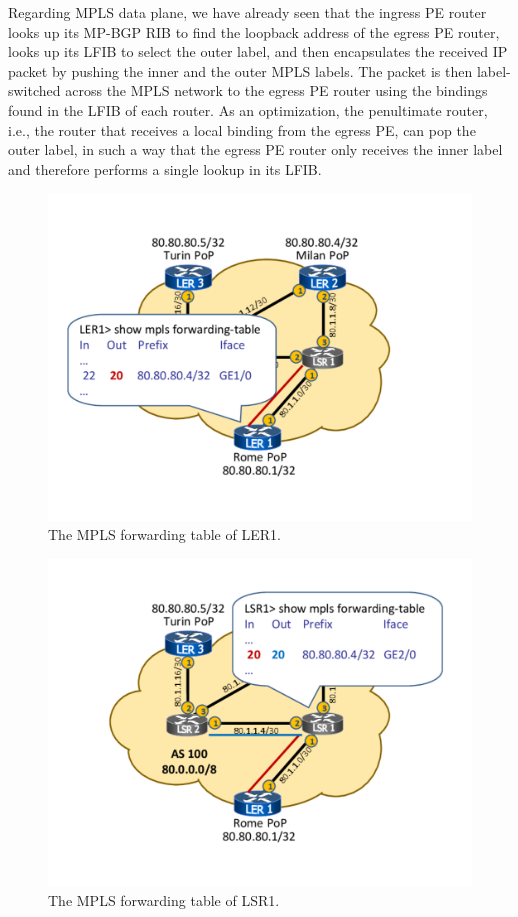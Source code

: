 \documentclass{article}
\begin{document}
Regarding MPLS data plane, we have already seen that the ingress PE router looks 
up its MP-BGP RIB to find the loopback address of the egress PE router, looks up 
its LFIB to select the outer label, and then encapsulates the received IP packet by 
pushing the inner and the outer MPLS labels. The packet is then label-switched 
across the MPLS network to the egress PE router using the bindings found in the 
LFIB of each router. As an optimization, the penultimate router, i.e., the 
router that receives a local binding from the egress PE, can pop the outer 
label, in such a way that the egress PE router only receives the inner label and 
therefore performs a single lookup in its LFIB.

\begin{figure}
\centering
 \includegraphics[trim=0cm 1.5cm 0cm 1.5cm, clip=true, width=0.7\columnwidth]{figures/mpls-slides-14}
 \caption{The MPLS forwarding table of LER1.}
 \label{fig:mpls-slides-14}
\end{figure}

\begin{figure}
\centering
 \includegraphics[trim=0cm 1.5cm 0cm 1.5cm, clip=true, width=0.7\columnwidth]{figures/mpls-slides-15}
 \caption{The MPLS forwarding table of LSR1.}
 \label{fig:mpls-slides-15}
\end{figure}
\end{document}
